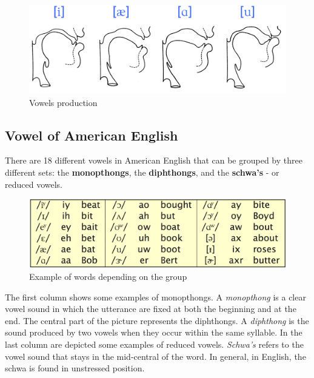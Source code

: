\begin{figure}[!ht]
    \centering
    \includegraphics[scale=0.5]{Figures/vowels_prod.png}
    \caption{Vowels production \cite{mit_phonetics}}
    \label{fig:vowels_prod}
\end{figure}

\subsection{Vowel of American English}
\label{sub:vowel_of_american_english}
There are 18 different vowels in American English that can be grouped by three different sets: the \textbf{monopthongs}, the \textbf{diphthongs}, and the \textbf{schwa's} - or reduced vowels.

\begin{figure}[!ht]
    \centering
    \includegraphics[scale=0.5]{Figures/vowels_sets.png}
    \caption{Example of words depending on the group \cite{mit_phonetics}}
    \label{fig:vowels_sets}
\end{figure}

The first column shows some examples of monopthongs. A \textit{monopthong} is a clear vowel sound in which the utterance are fixed at both the beginning and at the end. The central part of the picture represents the diphthongs. A \textit{diphthong} is the sound produced by two vowels when they occur within the same syllable. In the last column are depicted some examples of reduced vowels. \textit{Schwa's} refers to the vowel sound that stays in the mid-central of the word. In general, in English, the schwa is found in unstressed position.


